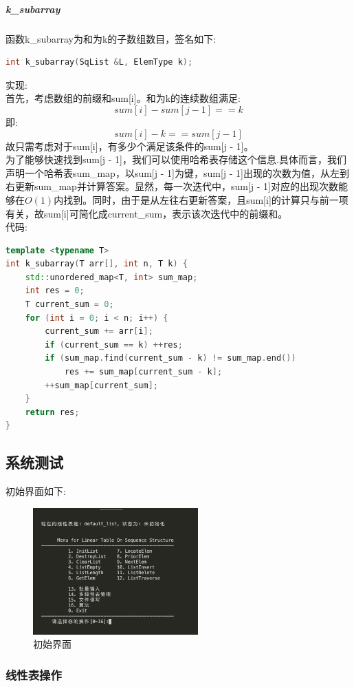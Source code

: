 \documentclass[supercite]{Experimental_Report}
\theoremstyle{definition}
\begin{document}
\subparagraph{k\_subarray}
\noindent
函数k\_subarray为和为k的子数组数目，签名如下:
\begin{lstlisting}[language=C++, frame=single]
int k_subarray(SqList &L, ElemType k);
\end{lstlisting}

\noindent
实现: \\
首先，考虑数组的前缀和sum[i]。和为k的连续数组满足: $$sum[i] - sum[j - 1] == k$$
即: $$sum[i] - k == sum[j - 1]$$
故只需考虑对于sum[i]，有多少个满足该条件的sum[j - 1]。\\
为了能够快速找到sum[j - 1]，我们可以使用哈希表存储这个信息.具体而言，我们声明一个哈希表sum\_map，以sum[j - 1]为键，sum[j - 1]出现的次数为值，从左到右更新sum\_map并计算答案。显然，每一次迭代中，sum[j - 1]对应的出现次数能够在$O(1)$内找到。同时，由于是从左往右更新答案，且sum[i]的计算只与前一项有关，故sum[i]可简化成current\_sum，表示该次迭代中的前缀和。\\
\noindent
代码:
\begin{lstlisting}[language=C++, frame=single]
template <typename T>
int k_subarray(T arr[], int n, T k) {
	std::unordered_map<T, int> sum_map;
	int res = 0;
	T current_sum = 0;
	for (int i = 0; i < n; i++) {
		current_sum += arr[i];
		if (current_sum == k) ++res;
		if (sum_map.find(current_sum - k) != sum_map.end())
			res += sum_map[current_sum - k];
		++sum_map[current_sum];
	}
	return res;
}
\end{lstlisting}

\newpage

\subsection{系统测试}

\noindent
初始界面如下:
\begin{figure}[htbp]
	\centering
	\includegraphics[width=2.5in]{sq_list/initial_interface.png}
	\caption{初始界面}
	\label{fig1-1}
\end{figure}

\subsubsection{线性表操作}
\end{document}
